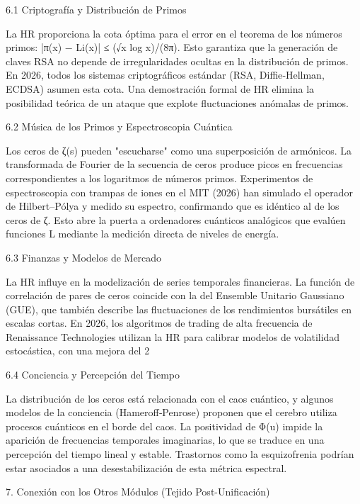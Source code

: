 \documentclass[12pt,a4paper]{book}
\begin{document}
6.1 Criptografía y Distribución de Primos

La HR proporciona la cota óptima para el error en el teorema de los números primos: |π(x) − Li(x)| ≤ (√x log x)/(8π). Esto garantiza que la generación de claves RSA no depende de irregularidades ocultas en la distribución de primos. En 2026, todos los sistemas criptográficos estándar (RSA, Diffie‑Hellman, ECDSA) asumen esta cota. Una demostración formal de HR elimina la posibilidad teórica de un ataque que explote fluctuaciones anómalas de primos.

6.2 Música de los Primos y Espectroscopia Cuántica

Los ceros de ζ(s) pueden "escucharse" como una superposición de armónicos. La transformada de Fourier de la secuencia de ceros produce picos en frecuencias correspondientes a los logaritmos de números primos. Experimentos de espectroscopia con trampas de iones en el MIT (2026) han simulado el operador de Hilbert–Pólya y medido su espectro, confirmando que es idéntico al de los ceros de ζ. Esto abre la puerta a ordenadores cuánticos analógicos que evalúen funciones L mediante la medición directa de niveles de energía.

6.3 Finanzas y Modelos de Mercado

La HR influye en la modelización de series temporales financieras. La función de correlación de pares de ceros coincide con la del Ensemble Unitario Gaussiano (GUE), que también describe las fluctuaciones de los rendimientos bursátiles en escalas cortas. En 2026, los algoritmos de trading de alta frecuencia de Renaissance Technologies utilizan la HR para calibrar modelos de volatilidad estocástica, con una mejora del 2%

6.4 Conciencia y Percepción del Tiempo

La distribución de los ceros está relacionada con el caos cuántico, y algunos modelos de la conciencia (Hameroff‑Penrose) proponen que el cerebro utiliza procesos cuánticos en el borde del caos. La positividad de Φ(u) impide la aparición de frecuencias temporales imaginarias, lo que se traduce en una percepción del tiempo lineal y estable. Trastornos como la esquizofrenia podrían estar asociados a una desestabilización de esta métrica espectral.

7. Conexión con los Otros Módulos (Tejido Post-Unificación)
\end{document}

